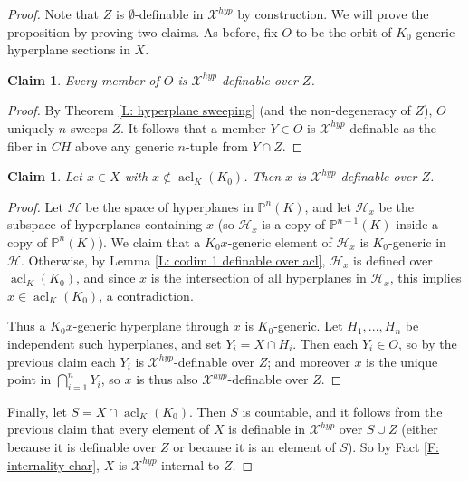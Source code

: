 \documentclass{amsart}
\newtheorem{claim}[theorem]{Claim}
\theoremstyle{definition}
\newcommand{\acl}{\operatorname{acl}}
\begin{document}
\begin{proof} Note that $Z$ is $\emptyset$-definable in $\mathcal X^{hyp}$ by construction. We will prove the proposition by proving two claims. As before, fix $O$ to be the orbit of $K_0$-generic hyperplane sections in $X$.

\begin{claim}
Every member of $O$ is $\mathcal X^{hyp}$-definable over $Z$.
\end{claim}

\begin{proof}
By Theorem \ref{L: hyperplane sweeping} (and the non-degeneracy of $Z$), $O$ uniquely $n$-sweeps $Z$. It follows that a member $Y\in O$ is $\mathcal X^{hyp}$-definable as the fiber in $CH$ above any generic $n$-tuple from $Y\cap Z$. 
\end{proof}

\begin{claim}
Let $x \in X$ with $x \notin \acl_K(K_0)$. Then $x$ is $\mathcal X^{hyp}$-definable over $Z$.
\end{claim}

\begin{proof}
Let $\mathcal{H}$ be the space of hyperplanes in $\mathbb{P}^n(K)$, and let $\mathcal{H}_x$ be the subspace of hyperplanes containing $x$ (so $\mathcal H_x$ is a copy of $\mathbb P^{n-1}(K)$ inside a copy of $\mathbb P^n(K)$). We claim that a $K_0x$-generic element of $\mathcal{H}_x$ is $K_0$-generic in $\mathcal{H}$. Otherwise, by Lemma \ref{L: codim 1 definable over acl}, $\mathcal{H}_x$ is defined over $\acl_K(K_0)$, and since $x$ is the intersection of all hyperplanes in $\mathcal{H}_x$, this implies $x \in \acl_K(K_0)$, a contradiction.

Thus a $K_0x$-generic hyperplane through $x$ is $K_0$-generic. Let $H_1,...,H_n$ be independent such hyperplanes, and set $Y_i = X \cap H_i$. Then each $Y_i\in O$, so by the previous claim each $Y_i$ is $\mathcal X^{hyp}$-definable over $Z$; and moreover $x$ is the unique point in $\bigcap_{i=1}^n Y_i$, so $x$ is thus also $\mathcal X^{hyp}$-definable over $Z$.
\end{proof}

Finally, let $S = X \cap \acl_K(K_0)$. Then $S$ is countable, and it follows from the previous claim that every element of $X$ is definable in $\mathcal X^{hyp}$ over $S\cup Z$ (either because it is definable over $Z$ or because it is an element of $S$). So by Fact \ref{F: internality char}, $X$ is $\mathcal X^{hyp}$-internal to $Z$.
\end{proof}
\end{document}
